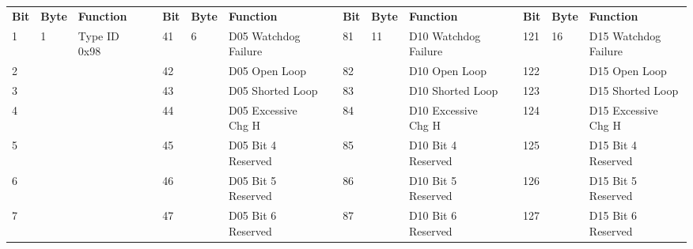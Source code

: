 \documentclass[]{article}
\begin{document}
\begin{landscape}
	\begin{table}[]
		\scriptsize
		\begin{tabular}{lllllllllllllll}
			\cline{1-3} \cline{5-7} \cline{9-11} \cline{13-15}
			\textbf{Bit} & \textbf{Byte}      & \textbf{Function}             & \multirow{9}{*}{} & \textbf{Bit} & \textbf{Byte}       & \textbf{Function}    &  & \textbf{Bit} & \textbf{Byte}       & \textbf{Function}    &  & \textbf{Bit}      & \textbf{Byte}       & \textbf{Function}    \\ \cline{1-3} \cline{5-7} \cline{9-11} \cline{13-15} 
			1            & \multirow{8}{*}{1} & \multirow{8}{*}{Type ID 0x98} &                   & 41           & \multirow{8}{*}{6}  & D05 Watchdog Failure &  & 81           & \multirow{8}{*}{11} & D10 Watchdog Failure &  & 121               & \multirow{8}{*}{16} & D15 Watchdog Failure \\
			2            &                    &                               &                   & 42           &                     & D05 Open Loop        &  & 82           &                     & D10 Open Loop        &  & 122               &                     & D15 Open Loop        \\
			3            &                    &                               &                   & 43           &                     & D05 Shorted Loop     &  & 83           &                     & D10 Shorted Loop     &  & 123               &                     & D15 Shorted Loop     \\
			4            &                    &                               &                   & 44           &                     & D05 Excessive Chg H  &  & 84           &                     & D10 Excessive Chg H  &  & 124               &                     & D15 Excessive Chg H  \\
			5            &                    &                               &                   & 45           &                     & D05 Bit 4 Reserved   &  & 85           &                     & D10 Bit 4 Reserved   &  & 125               &                     & D15 Bit 4 Reserved   \\
			6            &                    &                               &                   & 46           &                     & D05 Bit 5 Reserved   &  & 86           &                     & D10 Bit 5 Reserved   &  & 126               &                     & D15 Bit 5 Reserved   \\
			7            &                    &                               &                   & 47           &                     & D05 Bit 6 Reserved   &  & 87           &                     & D10 Bit 6 Reserved   &  & 127               &                     & D15 Bit 6 Reserved   \\

\end{tabular}
\end{table}
\end{landscape}
\end{document}
